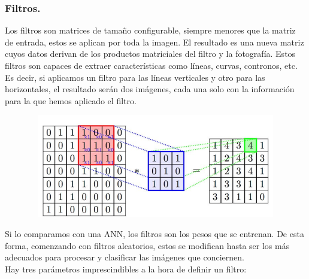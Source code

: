\documentclass[a4paper,10pt]{article}
\begin{document}
\subsubsection{Filtros.}
Los filtros son matrices de tamaño configurable, siempre menores que la matriz de entrada, estos se aplican por toda la imagen. El resultado es una nueva matriz cuyos datos derivan de los productos matriciales del filtro y la fotografía. Estos filtros son capaces de extraer características como líneas, curvas, contronos, etc.  \\Es decir, si aplicamos un filtro para las líneas verticales y otro para las horizontales, el resultado serán dos imágenes, cada una solo con la información para la que hemos aplicado el filtro.
\begin{figure}[H]
\centering
\includegraphics[width=12.0cm, height=4.5cm]{Annotation 2020-04-13 191448.png}
\end{figure}
\noindent
Si lo comparamos con una ANN, los filtros son los pesos que se entrenan. De esta forma, comenzando con filtros aleatorios, estos se modifican hasta ser los más adecuados para procesar y clasificar las imágenes que conciernen.\\
Hay tres parámetros imprescindibles a la hora de definir un filtro:
\end{document}
